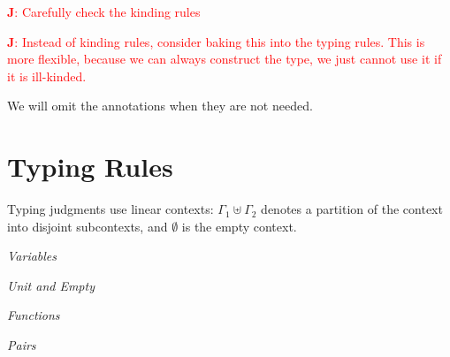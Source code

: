 \documentclass{article}
\newcommand{\kw}[1]{\text{\textbf{#1}}}
\newcommand{\Let}[3]{\kw{let}\, #1 = #2\, \kw{in}\, #3}
\newcommand{\Fun}[2]{\kw{fun}\, #1 \Rightarrow #2}
\newcommand{\App}[2]{#1\, #2}
\newcommand{\Pair}[2]{(#1, #2)}
\newcommand{\LetPair}[4]{\kw{let}\, (#1, #2) = #3\, \kw{in}\, #4}
\newcommand{\AnnotArrow}[1]{%
  \if\relax\detokenize{#1}\relax
    \to
  \else
    \xrightarrow[\AnnotBelow{#1}]{}
  \fi}
\newcommand{\AnnotBinop}[2]{%
  \if\relax\detokenize{#2}\relax
    #1
  \else
    \underset{\AnnotBelow{#2}}{#1}
  \fi}
\newcommand{\AnnotBelow}[1]{\smash{\raisebox{0.25ex}{$\scriptstyle #1$}}}
\newcommand{\TFun}[3][]{#2 \mathrel{\AnnotArrow{#1}} #3}
\newcommand{\TPair}[3][]{#2 \mathbin{\AnnotBinop{\times}{#1}} #3}
\newcommand{\TUnit}{\kw{unit}}
\newcommand{\TEmpty}{\kw{empty}}
\newcommand{\UnitTerm}{\kw{unit}}
\newcommand{\Absurd}[1]{\kw{absurd}\, #1}
\newcommand{\judge}[3]{#1 \vdash #2 : #3}
\newcommand{\Lock}[2][]{
  \text{\faLock}_{#1}(#2)
}
\newcommand{\jules}[1]{{\textcolor{red}{\textbf{J}: #1}}}
\begin{document}
\jules{Carefully check the kinding rules}

\jules{Instead of kinding rules, consider baking this into the typing rules. This is more flexible, because we can always construct the type, we just cannot use it if it is ill-kinded.}

We will omit the annotations when they are not needed.

\bigskip

\section{Typing Rules}

Typing judgments use linear contexts: $\Gamma_1 \uplus \Gamma_2$ denotes a partition of the context into disjoint subcontexts, and $\emptyset$ is the empty context.

\bigskip

\textit{Variables}

\vspace{0.5em}\textit{Unit and Empty}

\vspace{0.5em}\textit{Functions}

\vspace{0.5em}\textit{Pairs}
\end{document}
